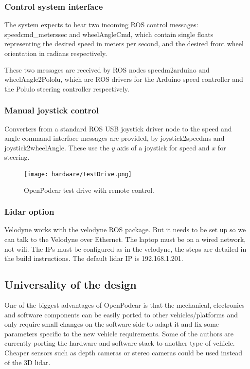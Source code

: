 \documentclass[a4paper]{article}
\begin{document}
\subsubsection{Control system interface}
The system expects to hear two incoming ROS control messages: speedcmd\_meterssec and wheelAngleCmd, which contain single floats representing the desired speed in meters per second, and the desired front wheel orientation in radians respectively.

These two messages are received by ROS nodes speedm2arduino and wheelAngle2Pololu, which are ROS drivers for the Arduino speed controller and the Polulo steering controller respectively.

\subsubsection{Manual joystick control}
Converters from a standard ROS USB joystick driver node to the speed and angle command interface messages are provided, by joystick2speedms and joystick2wheelAngle.  These use the $y$ axis of a joystick for speed and $x$ for steering.

\begin{figure}
	\centering
	\texttt{[image: hardware/testDrive.png]}
	\caption{OpenPodcar test drive with remote control.}
	\label{fig:testDrive}
\end{figure}

\subsubsection{Lidar option}
Velodyne works with the velodyne ROS package. But it needs to be set up so we can talk to the Velodyne over Ethernet. The laptop must be on a wired network, not wifi. The IPs must be configured as in the velodyne, the steps are detailed in the build instructions. The default lidar IP is 192.168.1.201. 


\subsection{Universality of the design}\label{h.q32f2nclh4e5}

One of the biggest advantages of OpenPodcar is that the mechanical, electronics and software components can be easily ported to other vehicles/platforms and only require small changes on the software side to adapt it and fix some parameters specific to the new vehicle requirements. Some of the authors are currently porting the hardware and software stack to another type of vehicle. Cheaper sensors such as depth cameras or stereo cameras could be used instead of the 3D lidar. 
\end{document}

